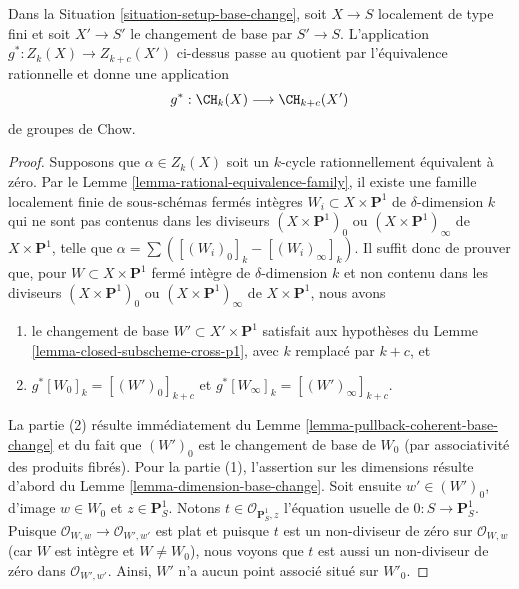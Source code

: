 \begin{lemma}
\label{lemma-pullback-base-change}
Dans la Situation \ref{situation-setup-base-change}, soit $X \to S$ localement
de type fini et soit $X' \to S'$ le changement de base par $S' \to S$.
L'application $g^* : Z_k(X) \to Z_{k + c}(X')$ ci-dessus passe au quotient par l'équivalence
rationnelle et donne une application
$$
g^* : \CH_k(X) \longrightarrow \CH_{k + c}(X')
$$
de groupes de Chow.
\end{lemma}

\begin{proof}
Supposons que $\alpha \in Z_k(X)$ soit un $k$-cycle rationnellement équivalent
à zéro. Par le Lemme \ref{lemma-rational-equivalence-family},
il existe une famille localement finie de sous-schémas fermés intègres
$W_i \subset X \times \mathbf{P}^1$ de $\delta$-dimension $k$
qui ne sont pas contenus dans les diviseurs
$(X \times \mathbf{P}^1)_0$ ou $(X \times \mathbf{P}^1)_\infty$
de $X \times \mathbf{P}^1$, telle que
$\alpha = \sum ([(W_i)_0]_k - [(W_i)_\infty]_k)$.
Il suffit donc de prouver que, pour $W \subset X \times \mathbf{P}^1$
fermé intègre de $\delta$-dimension $k$ et non contenu dans les diviseurs
$(X \times \mathbf{P}^1)_0$ ou $(X \times \mathbf{P}^1)_\infty$
de $X \times \mathbf{P}^1$, nous avons
\begin{enumerate}
\item le changement de base $W' \subset X' \times \mathbf{P}^1$ satisfait aux
hypothèses du Lemme \ref{lemma-closed-subscheme-cross-p1}, avec
$k$ remplacé par $k + c$, et
\item $g^*[W_0]_k = [(W')_0]_{k + c}$ et
$g^*[W_\infty]_k = [(W')_\infty]_{k + c}$.
\end{enumerate}
La partie (2) résulte immédiatement du
Lemme \ref{lemma-pullback-coherent-base-change} et du fait que
$(W')_0$ est le changement de base de $W_0$ (par associativité des produits fibrés).
Pour la partie (1), l'assertion sur les dimensions résulte d'abord
du Lemme \ref{lemma-dimension-base-change}.
Soit ensuite $w' \in (W')_0$, d'image $w \in W_0$
et $z \in \mathbf{P}^1_S$. Notons $t \in \mathcal{O}_{\mathbf{P}^1_S, z}$
l'équation usuelle de $0 : S \to \mathbf{P}^1_S$.
Puisque $\mathcal{O}_{W, w} \to \mathcal{O}_{W', w'}$ est plat
et puisque $t$ est un non-diviseur de zéro sur $\mathcal{O}_{W, w}$
(car $W$ est intègre et $W \not = W_0$), nous voyons que
$t$ est aussi un non-diviseur de zéro dans $\mathcal{O}_{W', w'}$. Ainsi,
$W'$ n'a aucun point associé situé sur $W'_0$.
\end{proof}


